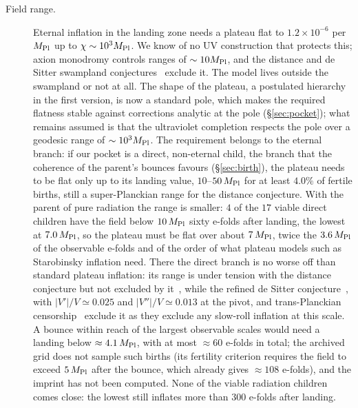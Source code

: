 \documentclass[11pt,a4paper]{article}
\newcommand{\Mpl}{M_{\rm Pl}}
\begin{document}
\begin{description}
\item[Field range.] Eternal inflation in the landing zone needs a plateau flat to $1.2\times10^{-6}$ per $\Mpl$ up to $\chi\sim10^3\Mpl$. We know of no UV construction that protects this; axion monodromy controls ranges of $\sim10\Mpl$, and the distance and de Sitter swampland conjectures~\cite{Obied2018} exclude it. The model lives outside the swampland or not at all. The shape of the plateau, a postulated hierarchy in the first version, is now a standard pole, which makes the required flatness stable against corrections analytic at the pole (\S\ref{sec:pocket}); what remains assumed is that the ultraviolet completion respects the pole over a geodesic range of $\sim10^3\Mpl$. The requirement belongs to the eternal branch: if our pocket is a direct, non-eternal child, the branch that the coherence of the parent's bounces favours (\S\ref{sec:birth}), the plateau needs to be flat only up to its landing value, $10$--$50\,\Mpl$ for at least $4.0\%$ of fertile births, still a super-Planckian range for the distance conjecture. With the parent of pure radiation the range is smaller: $4$ of the $17$ viable direct children have the field below $10\,\Mpl$ sixty e-folds after landing, the lowest at $7.0\,\Mpl$, so the plateau must be flat over about $7\,\Mpl$, twice the $3.6\,\Mpl$ of the observable e-folds and of the order of what plateau models such as Starobinsky inflation need. There the direct branch is no worse off than standard plateau inflation: its range is under tension with the distance conjecture but not excluded by it~\cite{ScalisiValenzuela2019}, while the refined de Sitter conjecture~\cite{OPSV2018}, with $|V'|/V\simeq0.025$ and $|V''|/V\simeq0.013$ at the pivot, and trans-Planckian censorship~\cite{BBLV2019} exclude it as they exclude any slow-roll inflation at this scale. A bounce within reach of the largest observable scales would need a landing below $\approx4.1\,\Mpl$, with at most $\approx60$ e-folds in total; the archived grid does not sample such births (its fertility criterion requires the field to exceed $5\,\Mpl$ after the bounce, which already gives $\approx108$ e-folds), and the imprint has not been computed. None of the viable radiation children comes close: the lowest still inflates more than $300$ e-folds after landing.

\end{description}
\end{document}
